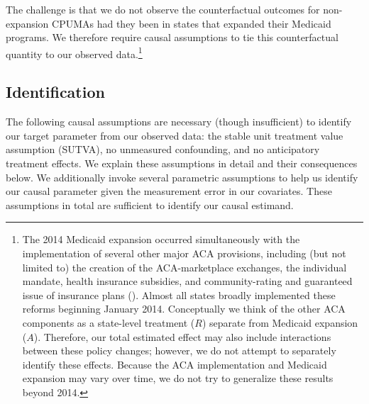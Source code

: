 \documentclass[article]{imsart}
\theoremstyle{plain}
\theoremstyle{remark}
\begin{document}
The challenge is that we do not observe the counterfactual outcomes for non-expansion CPUMAs had they been in states that expanded their Medicaid programs. We therefore require causal assumptions to tie this counterfactual quantity to our observed data.\footnote{The 2014 Medicaid expansion occurred simultaneously with the implementation of several other major ACA provisions, including (but not limited to) the creation of the ACA-marketplace exchanges, the individual mandate, health insurance subsidies, and community-rating and guaranteed issue of insurance plans (\cite{courtemanche2017early}). Almost all states broadly implemented these reforms beginning January 2014. Conceptually we think of the other ACA components as a state-level treatment ($R$) separate from Medicaid expansion ($A$). Therefore, our total estimated effect may also include interactions between these policy changes; however, we do not attempt to separately identify these effects. Because the ACA implementation and Medicaid expansion may vary over time, we do not try to generalize these results beyond 2014.} 

\subsection{Identification}

The following causal assumptions are necessary (though insufficient) to identify our target parameter from our observed data: the stable unit treatment value assumption (SUTVA), no unmeasured confounding, and no anticipatory treatment effects. We explain these assumptions in detail and their consequences below. We additionally invoke several parametric assumptions to help us identify our causal parameter given the measurement error in our covariates. These assumptions in total are sufficient to identify our causal estimand.
\end{document}
